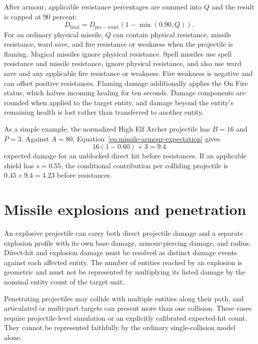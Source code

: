 \documentclass[11pt]{article}
\begin{document}
After armour, applicable resistance percentages are summed into $Q$ and the
result is capped at 90 percent:
\begin{equation}
  D_{\mathrm{final}}
  = D_{\mathrm{pre-resist}}
    \left(1-\min(0.90,Q)\right).
  \label{eq:missile-resistance}
\end{equation}
For an ordinary physical missile, $Q$ can contain physical resistance,
missile resistance, ward save, and fire resistance or weakness when the
projectile is flaming.  Magical missiles ignore physical resistance.  Spell
missiles use spell resistance and missile resistance, ignore physical
resistance, and also use ward save and any applicable fire resistance or
weakness.  Fire weakness is negative and can offset positive resistances.
Flaming damage additionally applies the On Fire status, which halves incoming
healing for ten seconds.  Damage components are rounded when applied to the
target entity, and damage beyond the entity's remaining health is lost rather
than transferred to another entity.

As a simple example, the normalized High Elf Archer projectile has $B=16$ and
$P=3$.  Against $A=80$, Equation~\ref{eq:missile-armour-expectation} gives
\begin{equation}
  16(1-0.60)+3=9.4
\end{equation}
expected damage for an unblocked direct hit before resistances.  If an
applicable shield has $s=0.55$, the conditional contribution per colliding
projectile is $0.45\times9.4=4.23$ before resistances.

\section{Missile explosions and penetration}

An explosive projectile can carry both direct projectile damage and a
separate explosion profile with its own base damage, armour-piercing damage,
and radius.  Direct-hit and explosion damage must be resolved as distinct
damage events against each affected entity.  The number of entities reached
by an explosion is geometric and must not be represented by multiplying its
listed damage by the nominal entity count of the target unit.

Penetrating projectiles may collide with multiple entities along their path,
and articulated or multi-part targets can present more than one collision.
These cases require projectile-level simulation or an explicitly calibrated
expected-hit count.  They cannot be represented faithfully by the ordinary
single-collision model alone.
\end{document}
